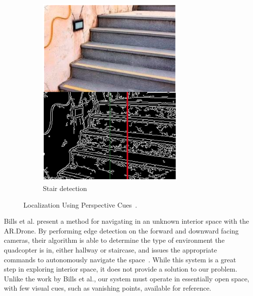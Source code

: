 \begin{figure}[ht]
            ~ %
            \begin{subfigure}[b]{0.5\textwidth}
                    \centering
                    \includegraphics[width=0.8\textwidth]{../images/Bills2.png}
                    \caption{Stair detection}
            \end{subfigure}
            \caption{Localization Using Perspective Cues~\cite{Bills}.}
    \end{figure}

	Bills et al. present a method for navigating in an unknown interior space with the AR.Drone. By performing edge detection on the forward and downward facing cameras, their algorithm is able to determine the type of environment the quadcopter is in, either hallway or staircase, and issues the appropriate commands to autonomously navigate the space~\cite{Bills}. While this system is a great step in exploring interior space, it does not provide a solution to our problem. Unlike the work by Bills et al., our system must operate in essentially open space, with few visual cues, such as vanishing points, available for reference.


